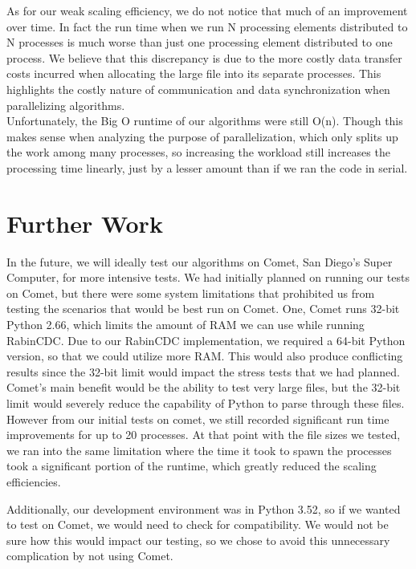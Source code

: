 \documentclass{acmtog} %
\begin{document}
	As for our weak scaling efficiency, we do not notice that much of an improvement over time. In fact the run time when we run N processing elements distributed to N processes is much worse than just one processing element distributed to one process. We believe that this discrepancy is due to the more costly data transfer costs incurred when allocating the large file into its separate processes. This highlights the costly nature of communication and data synchronization when parallelizing algorithms.\\

	
	Unfortunately, the Big O runtime of our algorithms were still O(n). Though this makes sense when analyzing the purpose of parallelization, which only splits up the work among many processes, so increasing the workload still increases the processing time linearly, just by a lesser amount than if we ran the code in serial. 
	

	\section{Further Work}
	In the future, we will ideally test our algorithms on Comet, San Diego's Super Computer, for more intensive tests. We had initially planned on running our tests on Comet, but there were some system limitations that prohibited us from testing the scenarios that would be best run on Comet. One, Comet runs 32-bit Python 2.66, which limits the amount of RAM we can use while running RabinCDC. Due to our RabinCDC implementation, we required a 64-bit Python version, so that we could utilize more RAM. This would also produce conflicting results since the 32-bit limit would impact the stress tests that we had planned. Comet's main benefit would be the ability to test very large files, but the 32-bit limit would severely reduce the capability of Python to parse through these files. However from our initial tests on comet, we still recorded significant run time improvements for up to 20 processes. At that point with the file sizes we tested, we ran into the same limitation where the time it took to spawn the processes took a significant portion of the runtime, which greatly reduced the scaling efficiencies. 
	
	Additionally, our development environment was in Python 3.52, so if we wanted to test on Comet, we would need to check for compatibility. We would not be sure how this would impact our testing, so we chose to avoid this unnecessary complication by not using Comet.
	
\end{document}

